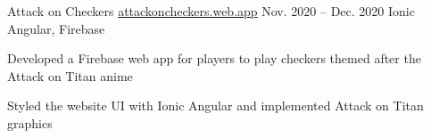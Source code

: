 
\begin{cvprojects}


  \cvproject
  {Attack on Checkers}
  {\href{https://github.com/lixinwei123/SE181}{attackoncheckers.web.app}}
  {Nov. 2020 -- Dec. 2020}
  {Ionic Angular, Firebase}
  {
    \begin{cvitems}
      \item Developed a Firebase web app for players to play checkers themed after the Attack on Titan anime
      \item Styled the website UI with Ionic Angular and implemented Attack on Titan graphics
    \end{cvitems}
  }





\end{cvprojects}
